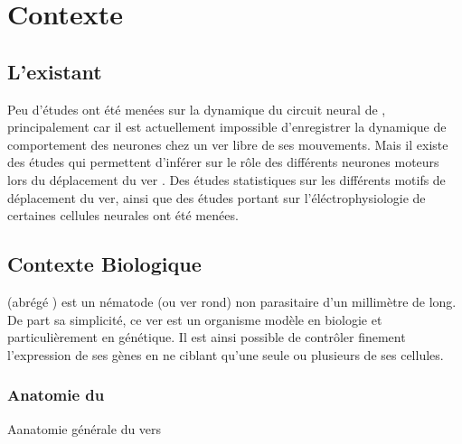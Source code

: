 \chapter{Contexte} %
\label{cha:Contexte}

\section{L'existant} %
\label{sec:L'existant}

Peu d'études ont été menées sur la dynamique du circuit neural de \celeg{},
principalement car il est actuellement impossible d'enregistrer la dynamique de
comportement des neurones chez un ver libre de ses mouvements.  Mais il existe
des études qui permettent d'inférer sur le rôle des différents neurones moteurs
lors du déplacement du ver \cite{Yanik2006,Chronis2007,Leifer2011}.  Des études
statistiques sur les différents motifs de déplacement \cite{Gray2005} du ver,
ainsi que des études portant sur l'éléctrophysiologie de certaines cellules
neurales \cite{Mellem2008a,Lockery2009} ont été menées.


\section{Contexte Biologique} %
\label{sec:Contexte Biologique}

\caeleg{} (abrégé \celeg{}) est un nématode (ou ver rond) non parasitaire d'un
millimètre de long. De part sa simplicité, ce ver est un organisme modèle en biologie
et particulièrement en génétique. Il est ainsi possible de contrôler
finement l'expression de ses gènes en ne ciblant qu'une seule ou plusieurs de
ses cellules.

\subsection{Anatomie du \celeg{}} %
\label{sub:Anatomie du caeleg}

\begin{center}
   Aanatomie générale du vers
\end{center}

